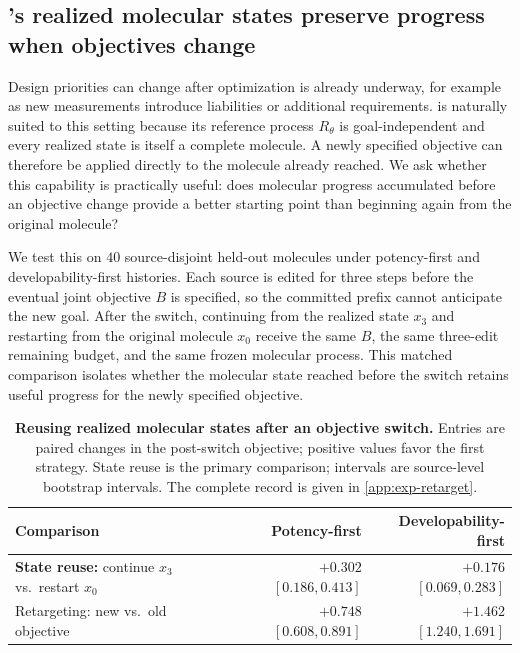 % 

\subsection{\method{}'s realized molecular states preserve progress when objectives change}
\label{sec:exp-retarget}

Design priorities can change after optimization is already underway, for example as new measurements introduce liabilities or additional requirements. \method{} is naturally suited to this setting because its reference process $R_\theta$ is goal-independent and every realized state is itself a complete molecule. A newly specified objective can therefore be applied directly to the molecule already reached. We ask whether this capability is practically useful: does molecular progress accumulated before an objective change provide a better starting point than beginning again from the original molecule?

We test this on $40$ source-disjoint held-out molecules under potency-first and developability-first histories. Each source is edited for three steps before the eventual joint objective $B$ is specified, so the committed prefix cannot anticipate the new goal. After the switch, continuing from the realized state $x_3$ and restarting from the original molecule $x_0$ receive the same $B$, the same three-edit remaining budget, and the same frozen molecular process. This matched comparison isolates whether the molecular state reached before the switch retains useful progress for the newly specified objective.

\begin{table}[!ht]
\centering
{\small
\begin{tabular}{lrr}
\toprule
Comparison & Potency-first & Developability-first \\
\midrule
\textbf{State reuse:} continue $x_3$ vs.\ restart $x_0$ & \textbf{$+0.302$} $[0.186,0.413]$ & \textbf{$+0.176$} $[0.069,0.283]$ \\
Retargeting: new vs.\ old objective & $+0.748$ $[0.608,0.891]$ & $+1.462$ $[1.240,1.691]$ \\
\bottomrule
\end{tabular}}
\caption{\small\textbf{Reusing realized molecular states after an objective switch.} Entries are paired changes in the post-switch objective; positive values favor the first strategy. State reuse is the primary comparison; intervals are source-level bootstrap intervals. The complete record is given in \cref{app:exp-retarget}.}
\label{tab:retarget}
\end{table}

